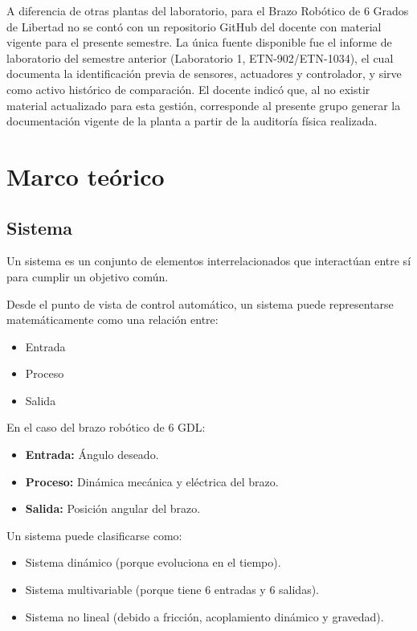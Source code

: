 \documentclass[11pt]{article}
\begin{document}
A diferencia de otras plantas del laboratorio, para el Brazo Robótico de 6 Grados de Libertad no se contó con un repositorio GitHub del docente con material vigente para el presente semestre. La única fuente disponible fue el informe de laboratorio del semestre anterior (Laboratorio 1, ETN-902/ETN-1034), el cual documenta la identificación previa de sensores, actuadores y controlador, y sirve como activo histórico de comparación. El docente indicó que, al no existir material actualizado para esta gestión, corresponde al presente grupo generar la documentación vigente de la planta a partir de la auditoría física realizada.

\section{Marco teórico}

\subsection{Sistema}

Un sistema es un conjunto de elementos interrelacionados que interactúan entre sí para cumplir un objetivo común.

Desde el punto de vista de control automático, un sistema puede representarse matemáticamente como una relación entre:

\begin{itemize}
	\item Entrada
	\item Proceso
	\item Salida
\end{itemize}

En el caso del brazo robótico de 6 GDL:

\begin{itemize}
	\item \textbf{Entrada:} Ángulo deseado.
	\item \textbf{Proceso:} Dinámica mecánica y eléctrica del brazo.
	\item \textbf{Salida:} Posición angular del brazo.
\end{itemize}

Un sistema puede clasificarse como:

\begin{itemize}
	\item Sistema dinámico (porque evoluciona en el tiempo).
	\item Sistema multivariable (porque tiene 6 entradas y 6 salidas).
	\item Sistema no lineal (debido a fricción, acoplamiento dinámico y gravedad).
\end{itemize}
\end{document}
